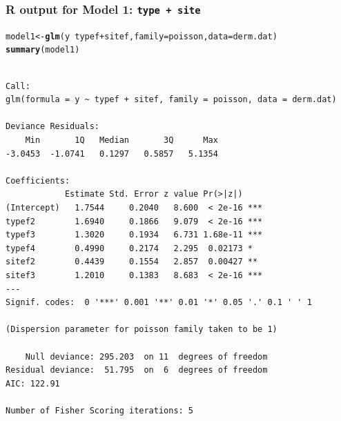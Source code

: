 \documentclass[oneside]{book}\usepackage[]{graphicx}\usepackage[svgnames]{xcolor}
\makeatletter
\newcommand{\hlopt}[1]{\textcolor[rgb]{0,0,0}{#1}}%
\newcommand{\hlstd}[1]{\textcolor[rgb]{0.345,0.345,0.345}{#1}}%
\newcommand{\hlkwb}[1]{\textcolor[rgb]{0.69,0.353,0.396}{#1}}%
\newcommand{\hlkwc}[1]{\textcolor[rgb]{0.333,0.667,0.333}{#1}}%
\newcommand{\hlkwd}[1]{\textcolor[rgb]{0.737,0.353,0.396}{\textbf{#1}}}%
\newenvironment{kframe}{%
 \def\at@end@of@kframe{}%
 \ifinner\ifhmode%
  \def\at@end@of@kframe{\end{minipage}}%
  \begin{minipage}{\columnwidth}%
 \fi\fi%
 \def\FrameCommand##1{\hskip\@totalleftmargin \hskip-\fboxsep
 \colorbox{shadecolor}{##1}\hskip-\fboxsep
     \hskip-\linewidth \hskip-\@totalleftmargin \hskip\columnwidth}%
 \MakeFramed {\advance\hsize-\width
   \@totalleftmargin\z@ \linewidth\hsize
   \@setminipage}}%
 {\par\unskip\endMakeFramed%
 \at@end@of@kframe}
\newenvironment{knitrout}{}{} %
\makeatother
\begin{document}
\subsubsection*{R output for Model 1: \texttt{type + site}}
\begin{knitrout}
\color{fgcolor}\begin{kframe}
\begin{alltt}
\hlstd{model1} \hlkwb{<-} \hlkwd{glm}\hlstd{(y} \hlopt{~} \hlstd{typef} \hlopt{+} \hlstd{sitef,} \hlkwc{family} \hlstd{= poisson,} \hlkwc{data} \hlstd{= derm.dat)}
\hlkwd{summary}\hlstd{(model1)}
\end{alltt}
\begin{verbatim}

Call:
glm(formula = y ~ typef + sitef, family = poisson, data = derm.dat)

Deviance Residuals: 
    Min       1Q   Median       3Q      Max  
-3.0453  -1.0741   0.1297   0.5857   5.1354  

Coefficients:
            Estimate Std. Error z value Pr(>|z|)    
(Intercept)   1.7544     0.2040   8.600  < 2e-16 ***
typef2        1.6940     0.1866   9.079  < 2e-16 ***
typef3        1.3020     0.1934   6.731 1.68e-11 ***
typef4        0.4990     0.2174   2.295  0.02173 *  
sitef2        0.4439     0.1554   2.857  0.00427 ** 
sitef3        1.2010     0.1383   8.683  < 2e-16 ***
---
Signif. codes:  0 '***' 0.001 '**' 0.01 '*' 0.05 '.' 0.1 ' ' 1

(Dispersion parameter for poisson family taken to be 1)

    Null deviance: 295.203  on 11  degrees of freedom
Residual deviance:  51.795  on  6  degrees of freedom
AIC: 122.91

Number of Fisher Scoring iterations: 5
\end{verbatim}
\end{kframe}
\end{knitrout}
\end{document}
